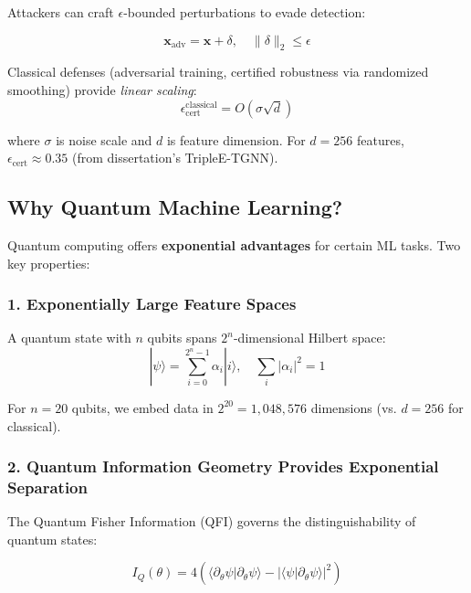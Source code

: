 \documentclass[11pt]{article}
\begin{document}
Attackers can craft $\epsilon$-bounded perturbations to evade detection:

\begin{equation}
\mathbf{x}_{\text{adv}} = \mathbf{x} + \delta, \quad \|\delta\|_2 \leq \epsilon
\end{equation}

Classical defenses (adversarial training, certified robustness via randomized smoothing) provide \textit{linear scaling}:
\begin{equation}
\epsilon_{\text{cert}}^{\text{classical}} = O(\sigma \sqrt{d})
\end{equation}

where $\sigma$ is noise scale and $d$ is feature dimension. For $d = 256$ features, $\epsilon_{\text{cert}} \approx 0.35$ (from dissertation's TripleE-TGNN).

\subsection{Why Quantum Machine Learning?}

Quantum computing offers \textbf{exponential advantages} for certain ML tasks. Two key properties:

\subsubsection{1. Exponentially Large Feature Spaces}

A quantum state with $n$ qubits spans $2^n$-dimensional Hilbert space:
\begin{equation}
|\psi\rangle = \sum_{i=0}^{2^n - 1} \alpha_i |i\rangle, \quad \sum_i |\alpha_i|^2 = 1
\end{equation}

For $n = 20$ qubits, we embed data in $2^{20} = 1{,}048{,}576$ dimensions (vs. $d = 256$ for classical).

\subsubsection{2. Quantum Information Geometry Provides Exponential Separation}

The Quantum Fisher Information (QFI) governs the distinguishability of quantum states:

\begin{equation}
I_Q(\theta) = 4 \left( \langle \partial_\theta \psi | \partial_\theta \psi \rangle - |\langle \psi | \partial_\theta \psi \rangle|^2 \right)
\end{equation}
\end{document}
